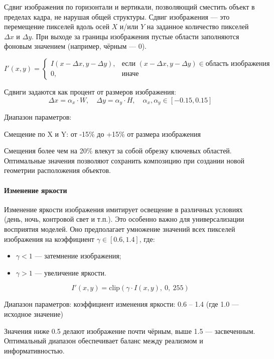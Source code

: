 Сдвиг изображения по горизонтали и вертикали, позволяющий сместить объект в пределах кадра, не нарушая общей структуры. 
Сдвиг изображения — это перемещение пикселей вдоль осей $X$ и/или $Y$ на заданное количество пикселей $\Delta x$ и $\Delta y$. При выходе за границы изображения пустые области заполняются фоновым значением (например, чёрным — 0).

\[
I'(x, y) =
\begin{cases}
	I(x - \Delta x, y - \Delta y), & \text{если } (x - \Delta x, y - \Delta y) \in \text{область изображения} \\
	0, & \text{иначе}
\end{cases}
\]

Сдвиги задаются как процент от размеров изображения:
\[
\Delta x = \alpha_x \cdot W,\quad \Delta y = \alpha_y \cdot H,\quad \alpha_x, \alpha_y \in [-0.15, 0.15]
\]

Диапазон параметров:

Смещение по X и Y: от -15\% до +15\% от размера изображения

Смещения более чем на 20\% влекут за собой обрезку ключевых областей. Оптимальные значения позволяют сохранить композицию при создании новой геометрии расположения объектов.


\paragraph{Изменение яркости}

Изменение яркости изображения имитирует освещение в различных условиях (день, ночь, контровой свет и т.п.). Это особенно важно для универсализации восприятия моделей. Оно предполагает умножение значений всех пикселей изображения на коэффициент $\gamma \in [0.6, 1.4]$, где:

\begin{itemize}
	\item $\gamma < 1$ — затемнение изображения;
	\item $\gamma > 1$ — увеличение яркости.
\end{itemize}

\[
I'(x, y) = \text{clip}\left( \gamma \cdot I(x, y),\ 0,\ 255 \right)
\]

Диапазон параметров: коэффициент изменения яркости: 0.6 – 1.4
(где 1.0 — исходное значение)

Значения ниже 0.5 делают изображение почти чёрным, выше 1.5 — засвеченным. Оптимальный диапазон обеспечивает баланс между реализмом и информативностью.

